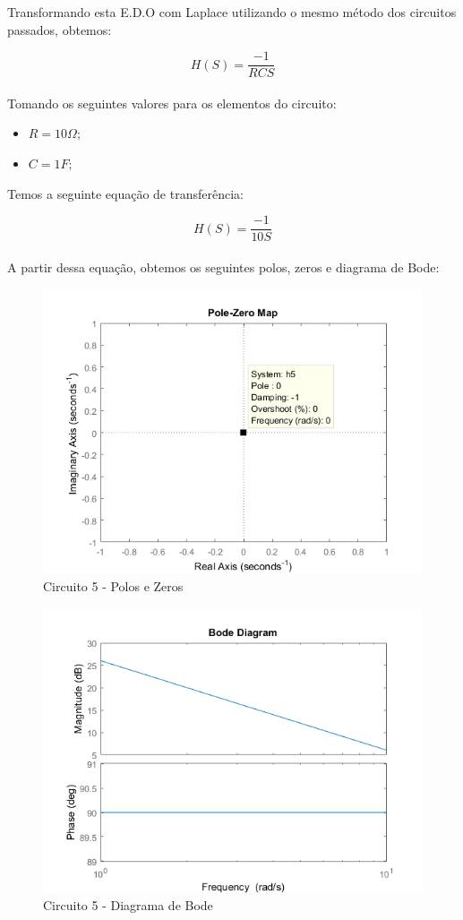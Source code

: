 \documentclass[a4paper, 12pt]{article}
\begin{document}
			Transformando esta E.D.O com Laplace utilizando o mesmo método dos circuitos passados, obtemos:
			
			\[
			H(S) = \frac{-1}{RCS}
			\] 	\\				
			
			Tomando os seguintes valores para os elementos do circuito:
			\begin{itemize}
				\item $R = 10\Omega;$
				\item $C = 1F;$
			\end{itemize}		
			
			Temos a seguinte equação de transferência:	
			
			\[
			H(S) = \frac{-1}{10S}
			\] 	\\					
			
			A partir dessa equação, obtemos os seguintes polos, zeros e diagrama de Bode:	
			
			\begin{figure}[!ht]
				\centering
				\includegraphics[scale=0.75]{img/1e_circ5.png}
				\caption{Circuito 5 - Polos e Zeros}	
			\end{figure}	
			\newpage
			\begin{figure}[!ht]
				\centering
				\includegraphics[scale=0.78]{img/1f_circ5.png}
				\caption{Circuito 5 - Diagrama de Bode}	
			\end{figure}				
			
\end{document}
